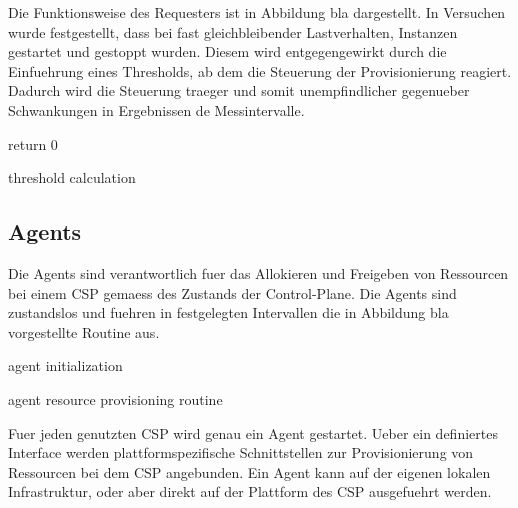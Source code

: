 \documentclass[runningheads]{llncs}
\begin{document}
Die Funktionsweise des Requesters ist in Abbildung bla dargestellt. In Versuchen wurde festgestellt, dass bei fast gleichbleibender Lastverhalten, Instanzen gestartet und gestoppt wurden. Diesem wird entgegengewirkt durch die Einfuehrung eines Thresholds, ab dem die Steuerung der Provisionierung reagiert. Dadurch  wird die Steuerung  traeger und somit unempfindlicher gegenueber Schwankungen in Ergebnissen de Messintervalle. \\


\begin{algorithm}[H]
	\DontPrintSemicolon
	{
		return 0
	}
	
	\caption{threshold calculation}
\end{algorithm}

\subsection{Agents}

Die Agents sind verantwortlich fuer das Allokieren und Freigeben von Ressourcen bei einem CSP gemaess des Zustands der Control-Plane. Die Agents sind zustandslos und fuehren in festgelegten Intervallen die in Abbildung bla vorgestellte Routine aus. \\

\begin{algorithm}[H]
	\DontPrintSemicolon
	\SetAlgoLined
	agent initialization\;
	\caption{agent resource provisioning routine}
\end{algorithm}

Fuer jeden genutzten CSP wird genau ein Agent gestartet. Ueber ein definiertes Interface werden plattformspezifische Schnittstellen zur Provisionierung von Ressourcen bei dem CSP angebunden. Ein Agent kann auf der eigenen lokalen Infrastruktur, oder aber direkt auf der Plattform des CSP ausgefuehrt werden.
	
\end{document}

